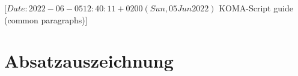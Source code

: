 %
%
%
%
%
%
%

                 [$Date: 2022-06-05 12:40:11 +0200 (Sun, 05 Jun 2022) $
                  KOMA-Script guide (common paragraphs)]

\section{Absatzauszeichnung}
%
\BeginIndexGroup
{}%

